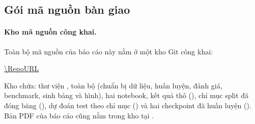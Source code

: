 \subsection{Gói mã nguồn bàn giao}
\label{sec:appendix-repro}

\paragraph{Kho mã nguồn công khai.}
Toàn bộ mã nguồn của báo cáo này nằm ở một kho Git công khai:

\begin{center}
\url{\RepoURL}
\end{center}

\noindent Kho chứa: thư viện , toàn bộ  (chuẩn bị dữ liệu, huấn
luyện, đánh giá, benchmark, sinh bảng và hình), hai notebook, kết quả thô (), chỉ
mục split đã đóng băng (), dự đoán test theo chỉ mục
() và hai checkpoint đã huấn luyện
(). Bản PDF của báo cáo cũng nằm trong kho tại
.

